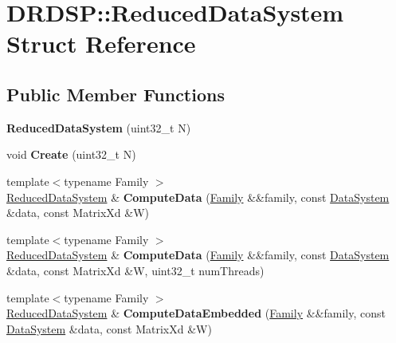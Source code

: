 \hypertarget{struct_d_r_d_s_p_1_1_reduced_data_system}{\section{D\-R\-D\-S\-P\-:\-:Reduced\-Data\-System Struct Reference}
\label{struct_d_r_d_s_p_1_1_reduced_data_system}
}
\subsection*{Public Member Functions}
\begin{DoxyCompactItemize}
\item 
\hypertarget{struct_d_r_d_s_p_1_1_reduced_data_system_ae3906c230fa802913600f69500cc966c}{{\bfseries Reduced\-Data\-System} (uint32\-\_\-t N)}\label{struct_d_r_d_s_p_1_1_reduced_data_system_ae3906c230fa802913600f69500cc966c}

\item 
\hypertarget{struct_d_r_d_s_p_1_1_reduced_data_system_a3c21ec70fddfeef04494c8bb8839bb3f}{void {\bfseries Create} (uint32\-\_\-t N)}\label{struct_d_r_d_s_p_1_1_reduced_data_system_a3c21ec70fddfeef04494c8bb8839bb3f}

\item 
\hypertarget{struct_d_r_d_s_p_1_1_reduced_data_system_a76b4ebd3a5728b1fd48f71361414b046}{{\footnotesize template$<$typename Family $>$ }\\\hyperlink{struct_d_r_d_s_p_1_1_reduced_data_system}{Reduced\-Data\-System} \& {\bfseries Compute\-Data} (\hyperlink{struct_d_r_d_s_p_1_1_family}{Family} \&\&family, const \hyperlink{struct_d_r_d_s_p_1_1_data_system}{Data\-System} \&data, const Matrix\-Xd \&W)}\label{struct_d_r_d_s_p_1_1_reduced_data_system_a76b4ebd3a5728b1fd48f71361414b046}

\item 
\hypertarget{struct_d_r_d_s_p_1_1_reduced_data_system_a343e5c8b1196db0186c0fb7624bdaa1c}{{\footnotesize template$<$typename Family $>$ }\\\hyperlink{struct_d_r_d_s_p_1_1_reduced_data_system}{Reduced\-Data\-System} \& {\bfseries Compute\-Data} (\hyperlink{struct_d_r_d_s_p_1_1_family}{Family} \&\&family, const \hyperlink{struct_d_r_d_s_p_1_1_data_system}{Data\-System} \&data, const Matrix\-Xd \&W, uint32\-\_\-t num\-Threads)}\label{struct_d_r_d_s_p_1_1_reduced_data_system_a343e5c8b1196db0186c0fb7624bdaa1c}

\item 
\hypertarget{struct_d_r_d_s_p_1_1_reduced_data_system_a7b13c371216aa735dd870d2413f66878}{{\footnotesize template$<$typename Family $>$ }\\\hyperlink{struct_d_r_d_s_p_1_1_reduced_data_system}{Reduced\-Data\-System} \& {\bfseries Compute\-Data\-Embedded} (\hyperlink{struct_d_r_d_s_p_1_1_family}{Family} \&\&family, const \hyperlink{struct_d_r_d_s_p_1_1_data_system}{Data\-System} \&data, const Matrix\-Xd \&W)}\label{struct_d_r_d_s_p_1_1_reduced_data_system_a7b13c371216aa735dd870d2413f66878}


\end{DoxyCompactItemize}
